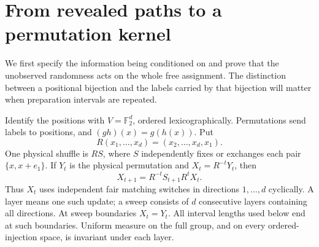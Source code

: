 \section{From revealed paths to a permutation kernel}\label{sec:conditional}

We first specify the information being conditioned on and prove that the unobserved randomness acts on the whole free assignment. The distinction between a positional bijection and the labels carried by that bijection will matter when preparation intervals are repeated.

Identify the positions with $V=\mathbb F_2^d$, ordered lexicographically. Permutations send labels to positions, and $(gh)(x)=g(h(x))$. Put
\[
 R(x_1,\ldots,x_d)=(x_2,\ldots,x_d,x_1).
\]
One physical shuffle is $RS$, where $S$ independently fixes or exchanges each pair $\{x,x+e_1\}$. If $Y_t$ is the physical permutation and $X_t=R^{-t}Y_t$, then
\[
 X_{t+1}=R^{-t}S_{t+1}R^tX_t.
\]
Thus $X_t$ uses independent fair matching switches in directions $1,\ldots,d$ cyclically. A layer means one such update; a sweep consists of $d$ consecutive layers containing all directions. At sweep boundaries $X_t=Y_t$. All interval lengths used below end at such boundaries. Uniform measure on the full group, and on every ordered-injection space, is invariant under each layer.

